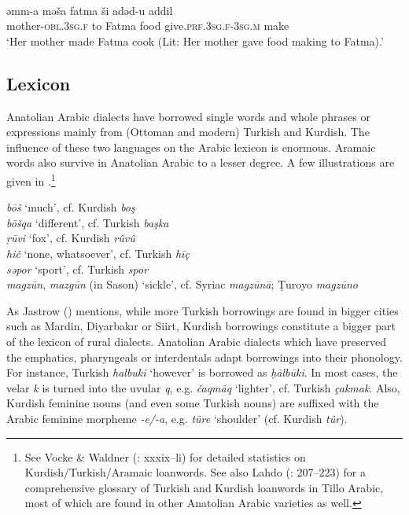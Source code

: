 \documentclass[output=paper]{langsci/langscibook}
\begin{document}
\begin{exe}
\ex \label{persa}
\\
\gll  	əmm-a mə\v{s}a fatma \v{s}i adəd-u    	addil	\\
  mother-\textsc{obl.3sg.f} to Fatma food      give.\textsc{prf.3sg.f-3sg.m}	make	 \\
        \glt `Her mother made Fatma cook (Lit: Her mother gave food making to Fatma).' 
\end{exe}



\subsection{Lexicon}
Anatolian Arabic dialects have borrowed single words and whole phrases or expressions mainly from (Ottoman and modern) Turkish and Kurdish. The influence of these two languages on the Arabic lexicon is enormous. Aramaic words also survive in Anatolian Arabic to a lesser degree. A few illustrations are given in .\footnote{See Vocke \& Waldner (\citeyear{VockeWaldner1982}: xxxix--li) for detailed statistics on Kurdish/Turkish/Aramaic loanwords. See also Lahdo (\citeyear{Lahdo2009}: 207--223) for a comprehensive glossary of Turkish and Kurdish loanwords in Tillo Arabic, most of which are found in other Anatolian Arabic varieties as well.} 

\ea \label{lex}
\noindent \textit{b\={o}\v{s}} `much', cf. Kurdish \textit{bo\c{s}}\\
\textit{b\={o}\v{s}qa} `different', cf. Turkish \textit{ba\c{s}ka}\\
\textit{\d{r}\={u}vi} `fox', cf. Kurdish \textit{r\^{u}v\^{u}}\\
\textit{hi\v{c}} `none, whatsoever', cf. Turkish \textit{hī\c{c}}\\
\textit{səpor} `sport', cf. Turkish \textit{spor}\\
\textit{magz\={u}n}, \textit{mazg\={u}n} (in Sason) `sickle', cf. Syriac \textit{magz\={u}n\={a}}; \d{T}uroyo \textit{magz\={u}no}\\
\z

\noindent As Jastrow (\citeyear[95]{Jastrow2011anatolian}) mentions, while more Turkish borrowings are found in bigger cities such as Mardin, Diyarbak{\i}r or Siirt, Kurdish borrowings constitute a bigger part of the lexicon of rural dialects. Anatolian Arabic dialects which have preserved the emphatics, pharyngeals or interdentals adapt borrowings into their phonology. For instance, Turkish \textit{halbuki} `however' is borrowed as \textit{\d{h}\={a}lb\={u}ki}. In most cases, the velar \textit{k} is turned into the uvular \textit{q}, e.g. \textit{\v{c}aqm\={a}q} `lighter', cf. Turkish \textit{\c{c}akmak}. Also, Kurdish feminine nouns (and even some Turkish nouns) are suffixed with the Arabic feminine morpheme \textit{-e/-a}, e.g. \textit{t\={u}re} `shoulder' (cf. Kurdish \textit{t\^{u}r}). 
\end{document}
